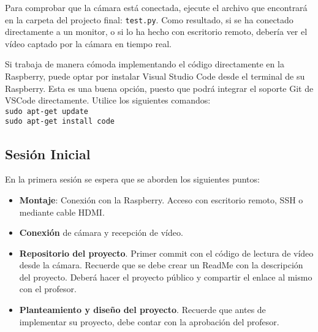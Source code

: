 Para comprobar que la cámara está conectada, ejecute el archivo que encontrará en la carpeta del projecto final: \texttt{test.py}. Como resultado, si se ha conectado directamente a un monitor, o si lo ha hecho con escritorio remoto, debería ver el vídeo captado por la cámara en tiempo real.

Si trabaja de manera cómoda implementando el código directamente en la Raspberry, puede optar por instalar Visual Studio Code desde el terminal de su Raspberry. Esta es una buena opción, puesto que podrá integrar el soporte Git de VSCode directamente. Utilice los siguientes comandos:\\

\texttt{sudo apt-get update}\\
\texttt{sudo apt-get install code}

\subsection*{Sesión Inicial}
{}
\vspace{5mm}
En la primera sesión se espera que se aborden los siguientes puntos:

\begin{itemize}
    \item \textbf{Montaje}: Conexión con la Raspberry. Acceso con escritorio remoto, SSH o mediante cable HDMI.
    \item \textbf{Conexión} de cámara y recepción de vídeo.
    \item \textbf{Repositorio del proyecto}. Primer commit con el código de lectura de vídeo desde la cámara. Recuerde que se debe crear un ReadMe con la descripción del proyecto. Deberá hacer el proyecto público y compartir el enlace al mismo con el profesor.
    \item  \textbf{Planteamiento y diseño del proyecto}. Recuerde que antes de implementar su proyecto, debe contar con la aprobación del profesor.
\end{itemize}